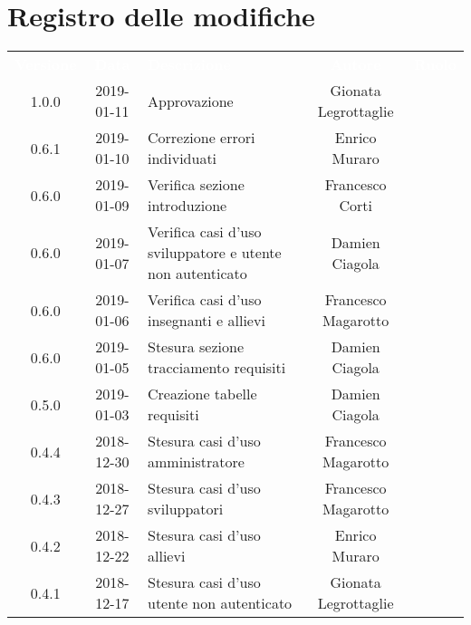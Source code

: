 \section*{Registro delle modifiche}
{
	\renewcommand{\arraystretch}{1.5}
	\centering
	\begin{longtable}{ c c C{6cm} c c }
		\textcolor{white}{\textbf{Versione}} & \textcolor{white}{\textbf{Data}} & \textcolor{white}{\textbf{Descrizione}} & \textcolor{white}{\textbf{Autore}} & \textcolor{white}{\textbf{Ruolo}}\\

		1.0.0 &
		2019-01-11 &
		Approvazione &	
		Gionata Legrottaglie&	
		\Res{} \\
		
		0.6.1 & 
		2019-01-10 &  
		Correzione errori individuati &	
		Enrico Muraro&	
		\reda{} \\
		
		0.6.0 & 
		2019-01-09 &  
		Verifica sezione introduzione &	
		Francesco Corti&	
		\ver{} \\
		
		0.6.0 & 
		2019-01-07 &  
		Verifica casi d'uso sviluppatore e utente non autenticato& 	
		Damien Ciagola  &	
		\ver{} \\
		
		0.6.0 & 
		2019-01-06 &  
		Verifica casi d'uso insegnanti e allievi & 
		Francesco Magarotto  &
		\ver{}  \\
		
		0.6.0 & 
		2019-01-05 &  
		Stesura sezione tracciamento requisiti &	
		Damien Ciagola &	
		\reda{} \\
		
		0.5.0 & 
		2019-01-03 &  
		Creazione tabelle requisiti&	
		Damien Ciagola &	
		\reda{} \\
		
		0.4.4 & 
		2018-12-30 &  
		Stesura casi d'uso amministratore &	
		Francesco Magarotto &	
		\reda{} \\
		
		0.4.3 & 
		2018-12-27 &  
		Stesura casi d'uso sviluppatori &	
		Francesco Magarotto &	
		\reda{} \\
		
		0.4.2 & 
		2018-12-22 &  
		Stesura casi d'uso allievi &	
		Enrico Muraro	&	
		\reda{} \\	
		
		0.4.1 & 
		2018-12-17 &  
		Stesura casi d'uso utente non autenticato &	
		Gionata Legrottaglie &	
		\reda{} \\
		

\end{longtable}}
